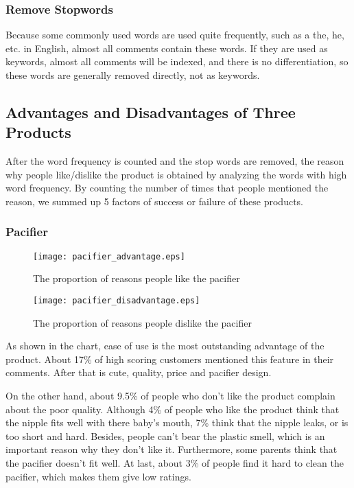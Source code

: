 \documentclass{mcmthesis}
\begin{document}
	\subsubsection{Remove Stopwords}
	Because some commonly used words are used quite frequently, such as a the, he, etc. in English, almost all comments contain these words. If they are used as keywords, almost all comments will be indexed, and there is no differentiation, so these words are generally removed directly, not as keywords.
	
	
	\subsection{Advantages and Disadvantages of Three Products}
	
	After the word frequency is counted and the stop words are removed, the reason why people like/dislike the product is obtained by analyzing the words with high word frequency.
	By counting the number of times that people mentioned the reason, we summed up 5 factors of success or failure of these products.
	\subsubsection{Pacifier}
	\begin{figure}[H]
		\begin{minipage}[t]{0.5\textwidth}
			\centering
			\texttt{[image: pacifier\_advantage.eps]}
			\caption{The proportion of reasons people like the pacifier\label{fig:1}}
		\end{minipage}
		\qquad
		\begin{minipage}[t]{0.5\textwidth}
			\centering
			\texttt{[image: pacifier\_disadvantage.eps]}
			\caption{The proportion of reasons people dislike the pacifier\label{fig:2}}
		\end{minipage}
	\end{figure}
		
		As shown in the chart, ease of use is the most outstanding advantage of the product. About 17\% of high scoring customers mentioned this feature in their comments. After that is cute, quality, price and pacifier design.
		
		
		On the other hand, about 9.5\% of people who don't like the product complain
		about the poor quality. Although 4\% of people who like the product think that the nipple fits well with there baby's mouth, 7\%  think that the nipple leaks, or is too short and hard. Besides, people can't bear the plastic smell, which is an important reason why they don't like it. Furthermore, some parents think that the pacifier doesn't fit well. At last, about 3\% of people find it hard to clean the pacifier, which makes them give low ratings.
	
\end{document}
